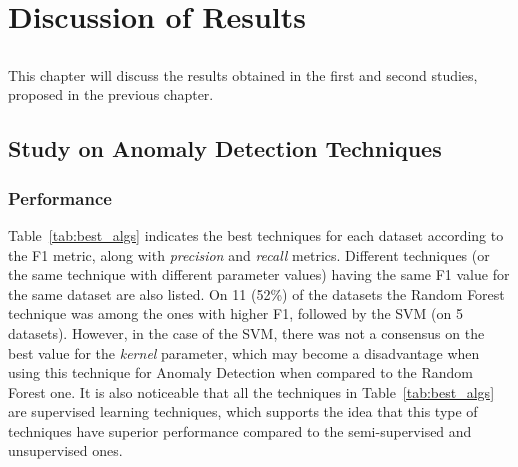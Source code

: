 \chapter{Discussion of Results} \label{chap:resul}

\section*{}

This chapter will discuss the results obtained in the first and second studies, proposed in the previous chapter.

\section{Study on Anomaly Detection Techniques}

\subsection{Performance}

Table~\ref{tab:best_algs} indicates the best techniques for each dataset according to the F1 metric, along with \textit{precision} and \textit{recall} metrics.
Different techniques (or the same technique with different parameter values) having the same F1 value for the same dataset are also listed.
On 11 (52\%) of the datasets the Random Forest technique was among the ones with higher F1, followed by the SVM (on 5 datasets).
However, in the case of the SVM, there was not a consensus on the best value for the \textit{kernel} parameter, which may become a disadvantage when using this technique for Anomaly Detection when compared to the Random Forest one.
It is also noticeable that all the techniques in Table~\ref{tab:best_algs} are supervised learning techniques, which supports the idea that this type of techniques have superior performance compared to the semi-supervised and unsupervised ones.


